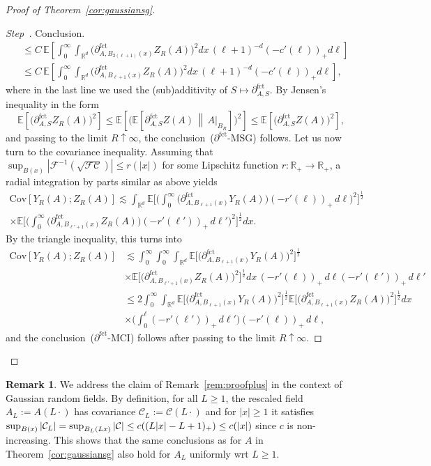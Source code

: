 \documentclass[11pt]{article}
\theoremstyle{definition}
\newtheorem{rema}[theo]{Remark}
\numberwithin{equation}{section}
\numberwithin{figure}{section}
\numberwithin{table}{section}
\newcommand{\R}{\mathbb R}
\newcommand{\E}{\mathbb{E}}
\newcommand{\expecM}[1]{\mathbb{E}\bigg[#1 \bigg]}
\newcommand{\expec}[1]{\mathbb{E}\left[#1 \right]}
\newcommand{\expeC}[2]{\mathbb{E}\left[\left. #1 \,\right\|\,#2\right]}
\newcommand{\Cc}{\mathcal C}
\newcommand{\F}{\mathcal F}
\newcommand{\parfct}[1]{\partial_{#1}^{\operatorname{fct}}}
\newcommand{\cov}[2]{\mathrm{Cov}\left[#1;#2\right]}
\newcounter{stepcount}
\newenvironment{step}{\refstepcounter{stepcount}\begin{proof}[Step~\thestepcount]}{\let\qed\relax\end{proof}}
\begin{document}
\begin{proof}[Proof of Theorem~\ref{cor:gaussiansg}]
\begin{step}{Conclusion.}
\begin{align*}
&\le C\,\E\left[\int_0^\infty \int_{\R^d}\Big(\parfct{A,B_{2(\ell+1)}(x)}Z_R(A)\Big)^2dx\,(\ell+1)^{-d}(-c'(\ell))_+d\ell\right]\\
&\le C\, \E\left[\int_0^\infty \int_{\R^d}\Big(\parfct{A,B_{\ell+1}(x)}Z_R(A)\Big)^2dx\,(\ell+1)^{-d}(-c'(\ell))_+d\ell\right],
\end{align*}
where in the last line we used the (sub)additivity of $S\mapsto\parfct{A,S}$. By Jensen's inequality in the form
\[
\expec{\Big(\parfct{A,S}Z_R(A)\Big)^2}\le\expec{\Big(\expeC{\parfct{A,S}Z(A)}{A|_{B_R}}\Big)^2}\le\expec{\Big(\parfct{A,S}Z(A)\Big)^2},
\]
and passing to the limit $R\uparrow\infty$, the conclusion~($\parfct{}$-MSG) follows. Let us now turn to the covariance inequality. Assuming that $\sup_{B(x)}|\F^{-1}(\sqrt{\F\Cc})|\le r(|x|)$ for some Lipschitz function $r:\R_+\to\R_+$, a radial integration by parts similar as above yields
\begin{multline*}
\cov {Y_R(A)}{Z_R(A)}\lesssim \int_{\R^d}\expecM{\bigg(\int_0^\infty \Big(\parfct{A,B_{\ell+1}(x)}Y_R(A)\Big)(-r'(\ell))_+\,d\ell\bigg)^2}^\frac12\\
\times\expecM{\bigg(\int_0^\infty \Big(\parfct{A,B_{\ell'+1}(x)}Z_R(A)\Big)(-r'(\ell'))_+\,d\ell'\bigg)^2}^\frac12 dx.
\end{multline*}
By the triangle inequality, this turns into
\begin{align*}
\cov {Y_R(A)}{Z_R(A)}&\lesssim \int_0^\infty\int_0^\infty\int_{\R^d}\expecM{\Big(\parfct{A,B_{\ell+1}(x)}Y_R(A)\Big)^2}^\frac12\\
&\times\expecM{\Big(\parfct{A,B_{\ell'+1}(x)}Z_R(A)\Big)^2}^\frac12 dx\,(-r'(\ell))_+\,d\ell(-r'(\ell'))_+\,d\ell'\\
&\le2\int_0^\infty\int_{\R^d}\expecM{\Big(\parfct{A,B_{\ell+1}(x)}Y_R(A)\Big)^2}^\frac12\expecM{\Big(\parfct{A,B_{\ell+1}(x)}Z_R(A)\Big)^2}^\frac12dx\\
&\times \Big(\int_0^\ell(-r'(\ell'))_+\,d\ell'\Big)(-r'(\ell))_+\,d\ell,
\end{align*}
and the conclusion~($\parfct{}$-MCI) follows after passing to the limit $R\uparrow\infty$.
\end{step}
\end{proof}

\begin{rema}\label{rem:rescale-2}
We address the claim of Remark~\ref{rem:proofplus} in the context of Gaussian random fields. By definition, for all $L\ge1$, the rescaled field $A_L:=A(L\cdot)$ has covariance $\Cc_L:=\Cc(L\cdot)$ and for $|x|\ge1$ it satisfies $\sup_{B(x)}|\Cc_L|=\sup_{B_L(Lx)}|\Cc|\linebreak\le c((L|x|-L+1)_+)\le c(|x|)$ since $c$ is non-increasing. This shows that the same conclusions as for $A$ in Theorem~\ref{cor:gaussiansg} also hold for $A_L$ uniformly wrt $L\ge1$.
\end{rema}
\end{document}
